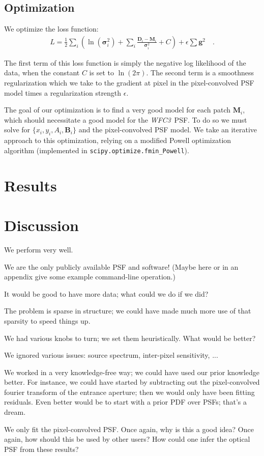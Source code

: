 \documentclass[12pt,letterpaper,preprint]{aastex}
\newcommand{\instrument}[1]{\textsl{#1}}
\newcommand{\vect}[1]{\mathbf{#1}}
\newcommand{\WFC}{\instrument{WFC3}}
\newcommand{\data}{\vect{D}}
\newcommand{\model}{\vect{M}}
\newcommand{\bkg}{\vect{B}}
\newcommand{\var}{\vect{\sigma}^2}
\newcommand{\gradients}{\vect{g}}
\begin{document}
\subsection{Optimization}

We optimize the loss function:
\begin{eqnarray}
L =  \frac{1}{2}\sum_i\left(\ln(\var_i) + \sum_{i} \frac{\data_i - \model_i}{\var_i} + C\right) + 
\epsilon \sum \gradients^2 
\quad .
\label{eqn:model-noflat}
\end{eqnarray}

\noindent The first term of this loss function is simply the negative log likelihood of the data, 
when the constant $C$ is set to $\ln(2\pi)$.  The second term is a smoothness regularization which 
we take to the gradient at pixel in the pixel-convolved PSF model times a regularization 
strength $\epsilon$.

The goal of our optimization is to find a very good model for each patch $\model_i$, which should 
necessitate a good model for the \WFC\ PSF.  To do so we must solve for $\{ x_i, y_i, A_i, \bkg_i \}$ 
and the pixel-convolved PSF model.  We take an iterative approach to this optimization, relying on  
a modified Powell optimization algorithm (implemented in \texttt{scipy.optimize.fmin\_Powell}). 

\section{Results}

\section{Discussion}

We perform very well.

We are the only publicly available PSF and software!
(Maybe here or in an appendix give some example command-line operation.)

It would be good to have more data;
  what could we do if we did?

The problem is sparse in structure;
  we could have made much more use of that sparsity to speed things up.

We had various knobs to turn; we set them heuristically.
What would be better?

We ignored various issues: source spectrum, inter-pixel sensitivity, ...

We worked in a very knowledge-free way;
  we could have used our prior knowledge better.
For instance, we could have started by subtracting out the pixel-convolved fourier transform of the entrance aperture;
  then we would only have been fitting residuals.
Even better would be to start with a prior PDF over PSFs;
  that's a dream.

We only fit the pixel-convolved PSF.
Once again, why is this a good idea?
Once again, how should this be used by other users?
How could one infer the optical PSF from these results?
\end{document}
